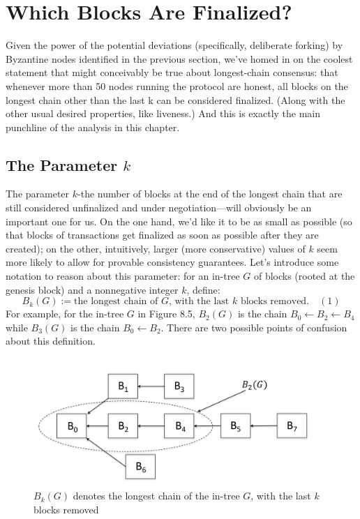 \section{Which Blocks Are Finalized?}
Given the power of the potential deviations (specifically, deliberate forking) by Byzantine
nodes identified in the previous section, we've homed in on the coolest statement that might
conceivably be true about longest-chain consensus: that whenever more than 50%
nodes running the protocol are honest, all blocks on the longest chain other than the last k
can be considered finalized. (Along with the other usual desired properties, like liveness.)
And this is exactly the main punchline of the analysis in this chapter.
\subsection{The Parameter $k$}
The parameter $k$-the number of blocks at the end of the longest chain that are still considered unfinalized and under negotiation—will obviously be an important one for us. On the
one hand, we’d like it to be as small as possible (so that blocks of transactions get finalized as
soon as possible after they are created); on the other, intuitively, larger (more conservative)
values of $k$ seem more likely to allow for provable consistency guarantees.
Let’s introduce some notation to reason about this parameter: for an in-tree $G$ of blocks
(rooted at the genesis block) and a nonnegative integer $k$, define:
$$B_k(G) := \text{the longest chain of $G$, with the last $k$ blocks removed.} \quad(1)$$
For example, for the in-tree $G$ in Figure 8.5, $B_2(G)$ is the chain $B_0 \gets B_2 \gets B_4$ while $B_3(G)$
is the chain $B_0 \gets B_2$.
There are two possible points of confusion about this definition.\\
\begin{figure}[h]
    \centering
    \includegraphics[scale = 0.5]{figures/f26.png}
    \caption{$B_k(G)$ denotes the longest chain of the in-tree $G$, with the last $k$ blocks removed
}
    \label{fig:mesh1}
\end{figure}\\


